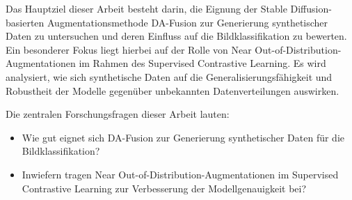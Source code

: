 Das Hauptziel dieser Arbeit besteht darin, die Eignung der Stable Diffusion-basierten Augmentationsmethode DA-Fusion zur Generierung synthetischer Daten zu untersuchen und deren Einfluss auf die Bildklassifikation zu bewerten. Ein besonderer Fokus liegt hierbei auf der Rolle von Near Out-of-Distribution-Augmentationen im Rahmen des Supervised Contrastive Learning. Es wird analysiert, wie sich synthetische Daten auf die Generalisierungsfähigkeit und Robustheit der Modelle gegenüber unbekannten Datenverteilungen auswirken.

Die zentralen Forschungsfragen dieser Arbeit lauten:
\begin{itemize}
    \item Wie gut eignet sich DA-Fusion zur Generierung synthetischer Daten für die Bildklassifikation? \item Inwiefern tragen Near Out-of-Distribution-Augmentationen im Supervised Contrastive Learning zur Verbesserung der Modellgenauigkeit bei?
\end{itemize}


